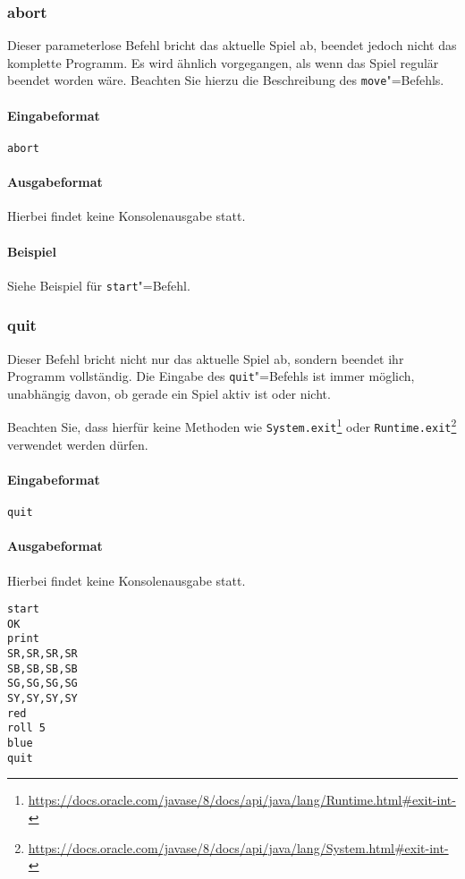 \documentclass[
  name=\assignment,
  start=\releasedate,
  end=\duedate,
  subject=\lecture\,--\,\semester,
  group=\group,
  url=\theurl,
  author=\authors,
  mail=\themail
]{assignment}
\newcommand{\code}[1]{\colorbox{codegray}{\texttt{#1}}}
\begin{document}
\subsubsection*{abort}
Dieser parameterlose Befehl bricht das aktuelle Spiel ab, beendet jedoch nicht das komplette Programm. Es wird ähnlich vorgegangen, als wenn das Spiel regulär beendet worden wäre. Beachten Sie hierzu die Beschreibung des \texttt{move}"=Befehls.
\paragraph{Eingabeformat}
\code{abort}
\paragraph{Ausgabeformat}
Hierbei findet keine Konsolenausgabe statt.
\paragraph{Beispiel}
Siehe Beispiel für \texttt{start}"=Befehl.

\subsubsection*{quit}
Dieser Befehl bricht nicht nur das aktuelle Spiel ab, sondern beendet ihr Programm vollständig. Die Eingabe des \texttt{quit}"=Befehls ist immer möglich, unabhängig davon, ob gerade ein Spiel aktiv ist oder nicht.

Beachten Sie, dass hierfür keine Methoden wie \texttt{System.exit}\footnote{\url{https://docs.oracle.com/javase/8/docs/api/java/lang/Runtime.html\#exit-int-}} oder \texttt{Runtime.exit}\footnote{\url{https://docs.oracle.com/javase/8/docs/api/java/lang/System.html\#exit-int-}} verwendet werden dürfen.
\paragraph{Eingabeformat}
\code{quit}
\paragraph{Ausgabeformat}
Hierbei findet keine Konsolenausgabe statt.
\begin{tcolorbox}[title=Beispiel]
\begin{verbatim}
start
OK
print
SR,SR,SR,SR
SB,SB,SB,SB
SG,SG,SG,SG
SY,SY,SY,SY
red
roll 5
blue
quit
\end{verbatim}
\end{tcolorbox}
\end{document}
